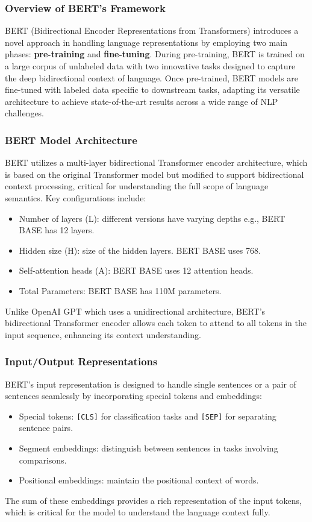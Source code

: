 \documentclass[11pt,xcolor={dvipsnames},hyperref={pdftex,pdfpagemode=UseNone,hidelinks,pdfdisplaydoctitle=true},usepdftitle=false]{beamer}
\begin{document}
\begin{frame}
\frametitle{Overview of BERT's Framework}
BERT (Bidirectional Encoder Representations from Transformers) introduces a novel approach in handling language representations by employing two main phases: \textbf{pre-training} and \textbf{fine-tuning}. During pre-training, BERT is trained on a large corpus of unlabeled data with two innovative tasks designed to capture the deep bidirectional context of language. Once pre-trained, BERT models are fine-tuned with labeled data specific to downstream tasks, adapting its versatile architecture to achieve state-of-the-art results across a wide range of NLP challenges.
\end{frame}

\begin{frame}
\frametitle{BERT Model Architecture}
BERT utilizes a multi-layer bidirectional Transformer encoder architecture, which is based on the original Transformer model but modified to support bidirectional context processing, critical for understanding the full scope of language semantics. Key configurations include:
\begin{itemize}
    \item Number of layers (L): different versions have varying depths e.g., BERT BASE has 12 layers.
    \item Hidden size (H): size of the hidden layers. BERT BASE uses 768.
    \item Self-attention heads (A): BERT BASE uses 12 attention heads.
    \item Total Parameters: BERT BASE has 110M parameters.
\end{itemize}
Unlike OpenAI GPT which uses a unidirectional architecture, BERT's bidirectional Transformer encoder allows each token to attend to all tokens in the input sequence, enhancing its context understanding.
\end{frame}

\begin{frame}
\frametitle{Input/Output Representations}
BERT's input representation is designed to handle single sentences or a pair of sentences seamlessly by incorporating special tokens and embeddings:
\begin{itemize}
    \item Special tokens: {\tt [CLS]} for classification tasks and {\tt [SEP]} for separating sentence pairs.
    \item Segment embeddings: distinguish between sentences in tasks involving comparisons.
    \item Positional embeddings: maintain the positional context of words.
\end{itemize}
The sum of these embeddings provides a rich representation of the input tokens, which is critical for the model to understand the language context fully.
\end{frame}
\end{document}

